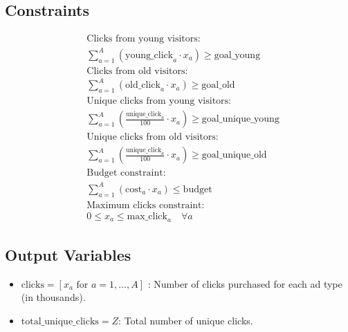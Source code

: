 \documentclass{article}
\begin{document}
\subsection*{Constraints}
\begin{align*}
    & \text{Clicks from young visitors:} \\
    & \sum_{a=1}^{A} (\text{young\_click}_a \cdot x_a) \geq \text{goal\_young} \\
    & \text{Clicks from old visitors:} \\
    & \sum_{a=1}^{A} (\text{old\_click}_a \cdot x_a) \geq \text{goal\_old} \\
    & \text{Unique clicks from young visitors:} \\
    & \sum_{a=1}^{A} \left( \frac{\text{unique\_click}_a}{100} \cdot x_a \right) \geq \text{goal\_unique\_young} \\
    & \text{Unique clicks from old visitors:} \\
    & \sum_{a=1}^{A} \left( \frac{\text{unique\_click}_a}{100} \cdot x_a \right) \geq \text{goal\_unique\_old} \\
    & \text{Budget constraint:} \\
    & \sum_{a=1}^{A} \left( \text{cost}_a \cdot x_a \right) \leq \text{budget} \\
    & \text{Maximum clicks constraint:} \\
    & 0 \leq x_a \leq \text{max\_click}_a \quad \forall a
\end{align*}

\subsection*{Output Variables}
\begin{itemize}
    \item \( \text{clicks} = [x_a \text{ for } a = 1, \ldots, A] \) : Number of clicks purchased for each ad type (in thousands).
    \item \( \text{total\_unique\_clicks} = Z \): Total number of unique clicks.
\end{itemize}
\end{document}
